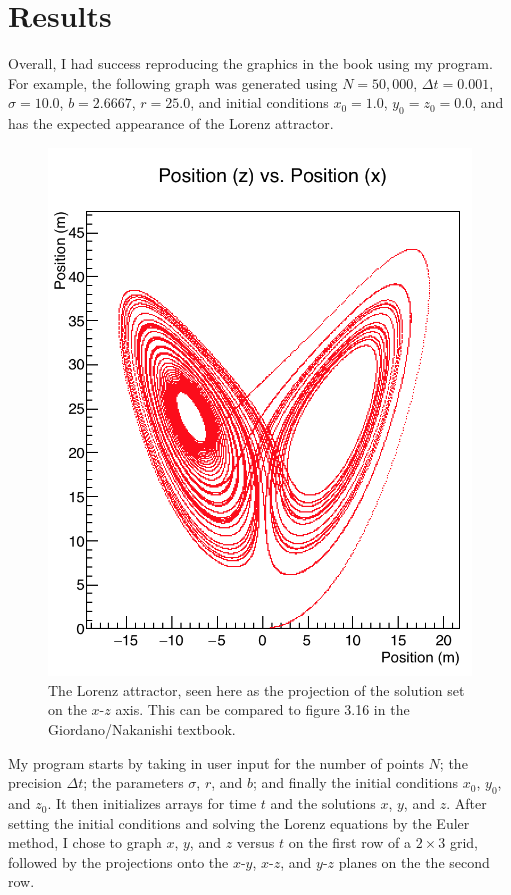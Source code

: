 \documentclass[12pt]{amsart}
\begin{document}
\newpage
\section{Results}
Overall, I had success reproducing the graphics in the book using my program. For example, the following graph was generated using 
$N = 50,000$, $\Delta t = 0.001$, $\sigma = 10.0$, $b = 2.6667$, $r = 25.0$, and initial conditions $x_0 = 1.0$, $y_0 = z_0 = 0.0$, and has the 
expected appearance of the Lorenz attractor.
\begin{figure}[h]
	\begin{center}
		\includegraphics[scale=0.65]{fig-1.png}
	\end{center}
	\caption{The Lorenz attractor, seen here as the projection of the solution set on the $x$-$z$ axis. This can be compared to figure 3.16
	in the Giordano/Nakanishi textbook.}
\end{figure}

My program starts by taking in user input for the number of points $N$; the precision $\Delta t$; the parameters $\sigma$, $r$, and 
$b$; and finally the initial conditions $x_0$, $y_0$, and $z_0$. It then initializes arrays for time $t$ and the solutions $x$, $y$, and $z$. After 
setting the initial conditions and solving the Lorenz equations by the Euler method, I chose to graph $x$, $y$, and $z$ versus $t$ on the first row
of a $2 \times 3$ grid, followed by the projections onto the $x$-$y$, $x$-$z$, and $y$-$z$ planes on the the second row.
\end{document}
